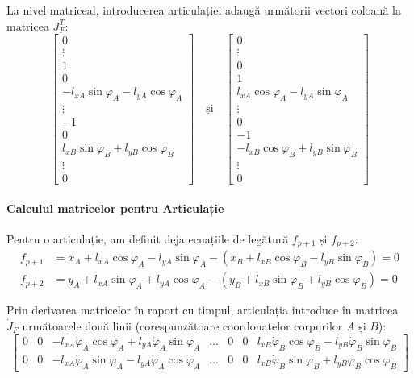 \documentclass[12pt, a4paper]{article}
\begin{document}
La nivel matriceal, introducerea articulației adaugă următorii vectori coloană la matricea $J_F^T$:
\begin{equation}
    \begin{bmatrix}
        0 \\ \vdots \\ 1 \\ 0 \\ -l_{xA}\sin\varphi_A - l_{yA}\cos\varphi_A \\ \vdots \\ -1 \\ 0 \\ l_{xB}\sin\varphi_B + l_{yB}\cos\varphi_B \\ \vdots \\ 0
    \end{bmatrix}
    \quad \text{și} \quad
    \begin{bmatrix}
        0 \\ \vdots \\ 0 \\ 1 \\ l_{xA}\cos\varphi_A - l_{yA}\sin\varphi_A \\ \vdots \\ 0 \\ -1 \\ -l_{xB}\cos\varphi_B + l_{yB}\sin\varphi_B \\ \vdots \\ 0
    \end{bmatrix}
\end{equation}

\paragraph{Calculul matricelor pentru Articulație}

Pentru o articulație, am definit deja ecuațiile de legătură $f_{p+1}$ și $f_{p+2}$:
\begin{equation}
    \begin{aligned}
        f_{p+1} &= x_A + l_{xA}\cos\varphi_A - l_{yA}\sin\varphi_A - (x_B + l_{xB}\cos\varphi_B - l_{yB}\sin\varphi_B) = 0 \\
        f_{p+2} &= y_A + l_{xA}\sin\varphi_A + l_{yA}\cos\varphi_A - (y_B + l_{xB}\sin\varphi_B + l_{yB}\cos\varphi_B) = 0
    \end{aligned}
\end{equation}

Prin derivarea matricelor în raport cu timpul, articulația introduce în matricea $\dot{J}_F$ următoarele două linii (corespunzătoare coordonatelor corpurilor $A$ și $B$):
\begin{equation}
    \begin{bmatrix}
        0 & 0 & -l_{xA}\dot{\varphi}_A\cos\varphi_A + l_{yA}\dot{\varphi}_A\sin\varphi_A & \dots & 0 & 0 & l_{xB}\dot{\varphi}_B\cos\varphi_B - l_{yB}\dot{\varphi}_B\sin\varphi_B \\
        0 & 0 & -l_{xA}\dot{\varphi}_A\sin\varphi_A - l_{yA}\dot{\varphi}_A\cos\varphi_A & \dots & 0 & 0 & l_{xB}\dot{\varphi}_B\sin\varphi_B + l_{yB}\dot{\varphi}_B\cos\varphi_B
    \end{bmatrix}
\end{equation}
\end{document}
